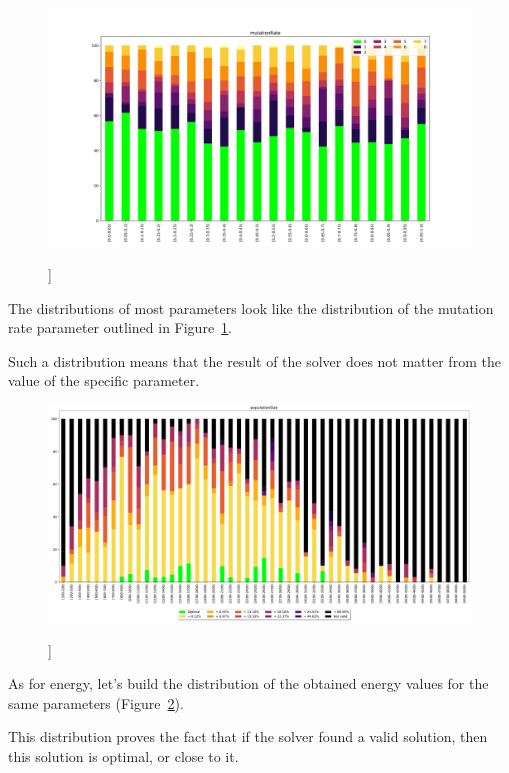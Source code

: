 \begin{figure}
	\centering
	\includegraphics[width=\textwidth]{images/mutationRate_gradient_500dpi.png}
	\caption[]]{}
	\label{fig:mutationRate_gradient}
\end{figure}

The distributions of most parameters look like the distribution of the mutation rate parameter outlined in Figure~\ref{fig:mutationRate_gradient}.

Such a distribution means that the result of the solver does not matter from the value of the specific parameter.

\begin{figure}
	\centering
	\includegraphics[width=\textwidth]{images/populationSizeObjective.pdf}
	\caption[]]{}
	\label{fig:populationSizeObjective}
\end{figure}

As for energy, let's build the distribution of the obtained energy values for the same parameters (Figure~\ref{fig:populationSizeObjective}).

This distribution proves the fact that if the solver found a valid solution, then this solution is optimal, or close to it.